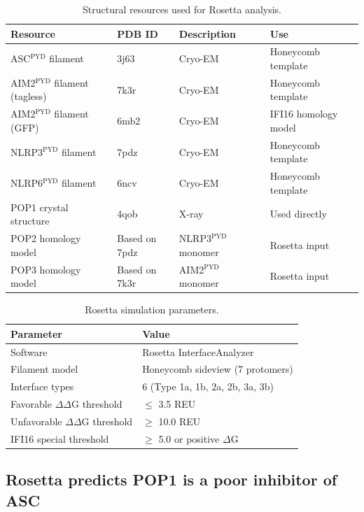 \documentclass[11pt,a4paper]{article}
\begin{document}
\begin{table}[htbp]
\centering
\caption{Structural resources used for Rosetta analysis.}
\label{tab:structures}
\small
\begin{tabular}{llll}
\toprule
\textbf{Resource} & \textbf{PDB ID} & \textbf{Description} & \textbf{Use} \\
\midrule
ASC$^{\text{PYD}}$ filament & 3j63 & Cryo-EM & Honeycomb template \\
AIM2$^{\text{PYD}}$ filament (tagless) & 7k3r & Cryo-EM & Honeycomb template \\
AIM2$^{\text{PYD}}$ filament (GFP) & 6mb2 & Cryo-EM & IFI16 homology model \\
NLRP3$^{\text{PYD}}$ filament & 7pdz & Cryo-EM & Honeycomb template \\
NLRP6$^{\text{PYD}}$ filament & 6ncv & Cryo-EM & Honeycomb template \\
POP1 crystal structure & 4qob & X-ray & Used directly \\
POP2 homology model & Based on 7pdz & NLRP3$^{\text{PYD}}$ monomer & Rosetta input \\
POP3 homology model & Based on 7k3r & AIM2$^{\text{PYD}}$ monomer & Rosetta input \\
\bottomrule
\end{tabular}
\end{table}

\begin{table}[htbp]
\centering
\caption{Rosetta simulation parameters.}
\label{tab:rosetta_params}
\begin{tabular}{ll}
\toprule
\textbf{Parameter} & \textbf{Value} \\
\midrule
Software & Rosetta InterfaceAnalyzer \\
Filament model & Honeycomb sideview (7 protomers) \\
Interface types & 6 (Type 1a, 1b, 2a, 2b, 3a, 3b) \\
Favorable $\Delta\Delta$G threshold & $\leq$ 3.5 REU \\
Unfavorable $\Delta\Delta$G threshold & $\geq$ 10.0 REU \\
IFI16 special threshold & $\geq$ 5.0 or positive $\Delta$G \\
\bottomrule
\end{tabular}
\end{table}

\subsection{Rosetta predicts POP1 is a poor inhibitor of ASC}
\end{document}
